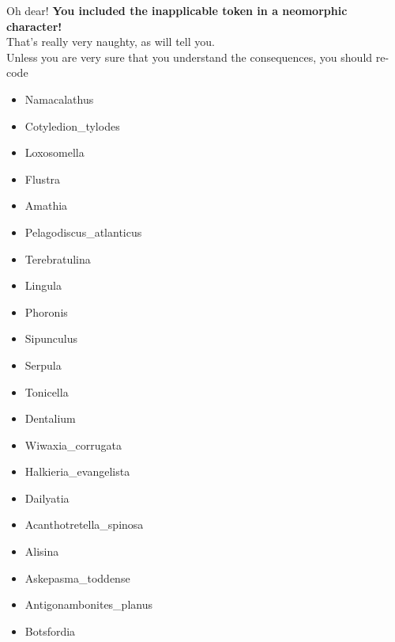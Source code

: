 \documentclass[openany]{book}
\providecommand{\tightlist}{%
  \setlength{\itemsep}{0pt}\setlength{\parskip}{0pt}}
\theoremstyle{definition}
\theoremstyle{definition}
\theoremstyle{definition}
\theoremstyle{remark}
\begin{document}
Oh dear! \textbf{You included the inapplicable token in a neomorphic
character!}\\
That's really very naughty, as \citet{Brazeau2018} will tell you.\\
Unless you are very sure that you understand the consequences, you
should re-code

\begin{itemize}
\tightlist
\item
  Namacalathus\\
\item
  Cotyledion\_tylodes\\
\item
  Loxosomella\\
\item
  Flustra\\
\item
  Amathia\\
\item
  Pelagodiscus\_atlanticus\\
\item
  Terebratulina\\
\item
  Lingula\\
\item
  Phoronis\\
\item
  Sipunculus\\
\item
  Serpula\\
\item
  Tonicella\\
\item
  Dentalium\\
\item
  Wiwaxia\_corrugata\\
\item
  Halkieria\_evangelista\\
\item
  Dailyatia\\
\item
  Acanthotretella\_spinosa\\
\item
  Alisina\\
\item
  Askepasma\_toddense\\
\item
  Antigonambonites\_planus\\
\item
  Botsfordia\\

\end{itemize}
\end{document}
